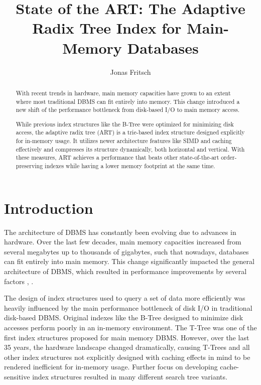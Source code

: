 \documentclass[acmtog, nonacm]{acmart}
\begin{document}
\title{State of the ART: The Adaptive Radix Tree Index for Main-Memory Databases}

\author{Jonas Fritsch}

\begin{abstract}
    With recent trends in hardware, main memory capacities have grown to an extent where most traditional DBMS 
    can fit entirely into memory. This change introduced a new shift of the performance bottleneck 
    from disk-based I/O to main memory access.
    
    While previous index structures like the B-Tree were optimized for minimizing disk access, the 
    adaptive radix tree (ART) is a trie-based index structure designed explicitly for in-memory usage. 
    It utilizes newer architecture features like SIMD and caching effectively and compresses its structure 
    dynamically, both horizontal and vertical. With these measures, ART achieves a performance that beats 
    other state-of-the-art order-preserving indexes while having a lower memory footprint at the same time.
\end{abstract}

\maketitle

\section{Introduction}

The architecture of DBMS has constantly been evolving due to advances in hardware. 
Over the last few decades, main memory capacities increased from several megabytes up to thousands 
of gigabytes, such that nowadays, databases can fit entirely into main memory. This change significantly 
impacted the general architecture of DBMS, which resulted in performance improvements 
by several factors \cite{10.1145/1376616.1376713}, \cite{7097722}.

The design of index structures used to query a set of data more efficiently was heavily influenced 
by the main performance bottleneck of disk I/O in traditional disk-based DBMS. 
Original indexes like the B-Tree designed to minimize disk accesses perform poorly 
in an in-memory environment. 
The T-Tree \cite{lehman1985study} was one of the first index structures proposed for main memory DBMS. 
However, over the last 35 years, the hardware landscape changed dramatically, causing T-Trees 
and all other index structures not explicitly designed with caching effects in mind to be rendered 
inefficient for in-memory usage\cite{rao1998cache}. Further focus on developing cache-sensitive index structures resulted in many 
different search tree variants.
\end{document}
